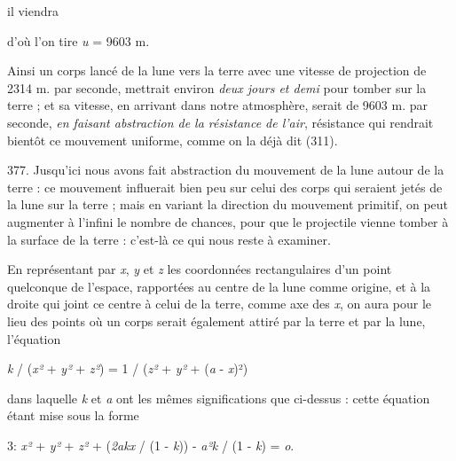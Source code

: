 \documentclass[a4paper, 11pt, oneside, polutonikogreek, french]{article}
\begin{document}

il viendra


d'où l'on tire \emph{u} = 9603 m.

Ainsi un corps lancé de la lune vers la terre avec une vitesse de projection de 2314 m. par seconde, mettrait environ \emph{deux jours et demi} pour tomber sur la terre ; et sa vitesse, en arrivant dans notre atmosphère, serait de 9603 m. par seconde, \emph{en faisant abstraction de la résistance de l'air}, résistance qui rendrait bientôt ce mouvement uniforme, comme on la déjà dit (311).

377. Jusqu'ici nous avons fait abstraction du mouvement de la lune autour de la terre : ce mouvement influerait bien peu sur celui des corps qui seraient jetés de la lune sur la terre ; mais en variant la direction du mouvement primitif, on peut augmenter à l'infini le nombre de chances, pour que le projectile vienne tomber à la surface de la terre : c'est-là ce qui nous reste à examiner.

En représentant par \emph{x}, \emph{y} et \emph{z} les coordonnées rectangulaires d'un point quelconque de l'espace, rapportées au centre de la lune comme origine, et à la droite qui joint ce centre à celui de la terre, comme axe des \emph{x}, on aura pour le lieu des points où un corps serait également attiré par la terre et par la lune, l'équation

\emph{k} / (\emph{x²} + \emph{y²} + \emph{z²}) = 1 / (\emph{z²} + \emph{y²} + (\emph{a} - \emph{x})²)

dans laquelle \emph{k} et \emph{a} ont les mêmes significations que ci-dessus : cette équation étant mise sous la forme

3: \emph{x²} + \emph{y²} + \emph{z²} + (\emph{2akx} / (1 - \emph{k})) -  \emph{a²k} / (1 - \emph{k}) = \emph{o}.

\end{document}

